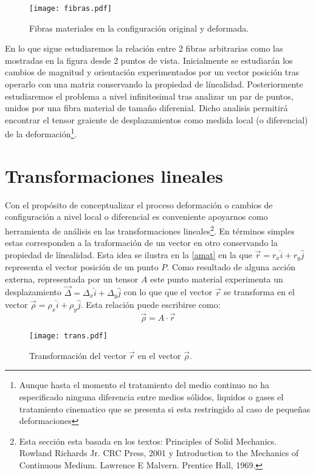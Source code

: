 \documentclass[../notas medios.tex]{subfiles}
\begin{document}
\begin{figure}[H]
\centering
	\texttt{[image: fibras.pdf]}
	\caption{Fibras materiales en la configuración original y deformada.}
	\label{fibras}
\end{figure}

En lo que sigue estudiaremos la relación entre 2 fibras arbitrarias como las mostradas en la figura desde 2 puntos de vista. Inicialmente se estudiarán los cambios de magnitud y orientación experimentados por un vector posición tras operarlo con una matriz conservando la propiedad de línealidad. Posteriormente estudiaremos el problema a nivel infinitesimal tras analizar un par de puntos, unidos por una fibra material de tamaño diferenial. Dicho analisis permitirá encontrar el tensor graiente de desplazamientos como medida local (o diferencial) de la deformación\footnote{Aunque hasta el momento el tratamiento del medio continuo no ha especificado ninguna diferencia entre medios sólidos, liquidos o gases el tratamiento cinematico que se presenta si esta restringido al caso de pequeñas deformaciones}.


\section{Transformaciones lineales}
Con el propósito de conceptualizar el proceso deformación o cambios de configuración a nivel local o diferencial es conveniente apoyarnos como herramienta de análisis en las transformaciones lineales\footnote{Esta sección esta basada en los textos: Principles of Solid Mechanics. Rowland Richards Jr. CRC Press, 2001 y Introduction to the Mechanics of Continuous Medium. Lawrence E Malvern. Prentice Hall, 1969.}. En términos simples estas corresponden a la traformación de un vector en otro conservando la propiedad de línealidad. Esta idea se ilustra en la \cref{amat} en la que $\vec r = {r_x}\hat i + {r_y}\hat j$ representa el vector posición de un punto $P$. Como resultado de alguna acción externa, representada por un tensor $A$ este punto material experimenta un desplazamiento $\vec \Delta  = {\Delta _x}\hat i + {\Delta _y}\hat j$ con lo que que el vector $\vec{r}$ se transforma en el vector $\vec \rho  = {\rho _x}\hat i + {\rho _y}\hat j$. Esta relación puede escribirse como:
\begin{equation}
\vec \rho  = A \cdot \vec r
\label{amat}
\end{equation}

\begin{figure}[H]
\centering
	\texttt{[image: trans.pdf]}
	\caption{Transformación del vector $\vec{r}$ en el vector $\vec{\rho}$.}
	\label{trans}
\end{figure}
\end{document}
